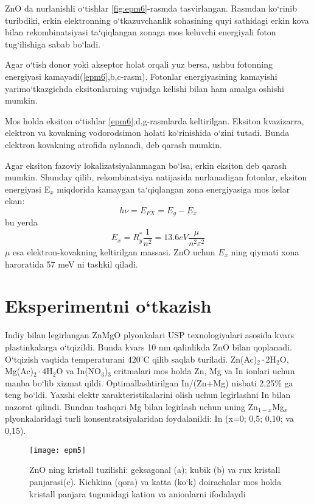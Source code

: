 \documentclass[14pt]{article}
\begin{document}
	ZnO da nurlanishli o`tishlar \ref{fig:epm6}-rasmda tasvirlangan. 
	Rasmdan ko`rinib turibdiki, erkin elektronning o`tkazuvchanlik sohasining quyi sathidagi erkin kova bilan rekombinatsiyasi ta`qiqlangan zonaga mos keluvchi energiyali foton tug`ilishiga sabab bo`ladi. 
	
	Agar o`tish donor yoki akseptor holat orqali yuz  bersa, ushbu fotonning energiyasi kamayadi(\ref{epm6},b,c-rasm). Fotonlar energiyasining kamayishi yarimo`tkazgichda eksitonlarning vujudga kelishi bilan ham amalga oshishi mumkin. 
	
	Mos holda eksiton o`tishlar \ref{epm6},d,g-rasmlarda keltirilgan. Eksiton kvazizarra, elektron va kovakning vodorodsimon holati ko`rinishida o`zini tutadi. Bunda elektron kovakning atrofida aylanadi, deb qarash mumkin. 
	
	Agar eksiton fazoviy lokalizatsiyalanmagan bo`lsa, erkin eksiton deb qarash mumkin. Shunday qilib, rekombinatsiya natijasida nurlanadigan fotonlar, eksiton energiyasi E$_{x}$ miqdorida kamaygan ta`qiqlangan zona energiyasiga mos kelar ekan:
	\begin{equation}
	h\nu=E_{FX}=E_{g}-E_{x}
	\end{equation}
	bu yerda 
	\begin{equation}
	E_{x}=R_{y}^{*}\frac{1}{n^{2}}=13.6 eV\frac{\mu}{n^{2}\varepsilon^{2}}
	\end{equation}
	$\mu$ esa elektron-kovakning keltirilgan massasi. ZnO uchun $E_{x}$ ning qiymati xona haroratida 57 meV ni tashkil qiladi. 
	 \section{Eksperimentni o`tkazish}
	Indiy bilan legirlangan ZnMgO plyonkalari USP texnologiyalari asosida kvars plastinkalarga o`tqizildi. Bunda kvars 10 nm qalinlikda ZnO bilan qoplanadi. O`tqizish vaqtida temperaturani 420$^{\circ}$C qilib saqlab turiladi. Zn(Ac)$_{2}\cdot 2$H$_{2}$O, Mg(Ac)$_{2}\cdot 4$H$_{2}$O va In(NO$_{3}$)$_{3}$ eritmalari mos holda Zn, Mg va In ionlari uchun manba bo`lib xizmat qildi. 
	Optimallashtirilgan In/(Zn+Mg) nisbati 2,25\% ga teng bo`ldi. Yaxshi elektr xarakteristikalarini olish uchun legirlashni In bilan nazorat qilindi. Bundan tashqari Mg bilan legirlash uchun uning Zn$_{1-x}$Mg$_{x}$ plyonkalaridagi turli konsentratsiyalaridan foydalanildi: In (x=0; 0,5; 0,10; va 0,15). 
	
	
\begin{figure*}[h]
	\centering
	\texttt{[image: epm5]}
	\caption{ZnO ning kristall tuzilishi: geksagonal (a); kubik (b) va rux kristall panjarasi(c). Kichkina (qora) va katta (ko`k) doirachalar mos holda kristall panjara tugunidagi kation va anionlarni ifodalaydi }
	\label{fig:epm5}
\end{figure*}
	
\end{document}
